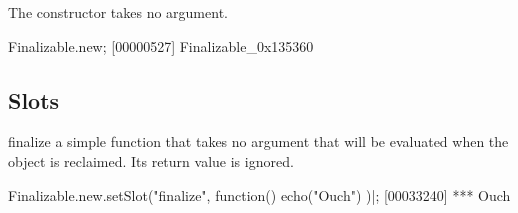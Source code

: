 The constructor takes no argument.

\begin{urbiscript}
Finalizable.new;
[00000527] Finalizable_0x135360
\end{urbiscript}

\subsection{Slots}

\begin{urbiscriptapi}
\item[finalize] a simple function that takes no argument that will be
  evaluated when the object is reclaimed.  Its return value is
  ignored.
\begin{urbiscript}
Finalizable.new.setSlot("finalize", function() { echo("Ouch") })|;
[00033240] *** Ouch
\end{urbiscript}
\end{urbiscriptapi}

